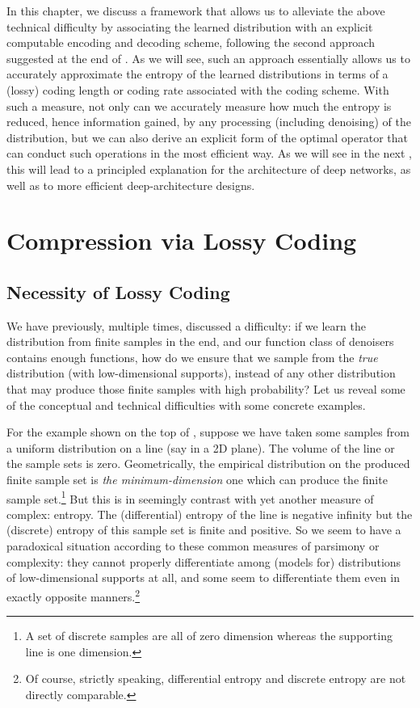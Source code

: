 \documentclass[../../book-main.tex]{subfiles}
\begin{document}
In this chapter, we discuss a framework that allows us to alleviate the above technical difficulty by associating the learned distribution with an explicit computable encoding and decoding scheme, following the second approach suggested at the end of . As we will see, such an approach essentially allows us to accurately approximate the entropy of the learned distributions in terms of a (lossy) coding length or coding rate associated with the coding scheme. With such a measure, not only can we accurately measure how much the entropy is reduced, hence information gained, by any processing (including denoising) of the distribution, but we can also derive an explicit form of the optimal operator that can conduct such operations in the most efficient way. As we will see in the next , this will lead to a principled explanation for the architecture of deep networks, as well as to more efficient deep-architecture designs.

\section{Compression via Lossy Coding} \label{sec:lossy_compression}

\subsection{Necessity of Lossy Coding}



We have previously, multiple times, discussed a difficulty: if we learn the distribution from finite samples in the end, and our function class of denoisers contains enough functions, how do we ensure that we sample from the \textit{true} distribution (with low-dimensional supports), instead of any other distribution that may produce those finite samples with high probability? Let us reveal some of the conceptual and technical difficulties with some concrete examples.

\begin{example}\label{eg:measures-of-complexity}
For the example shown on the top of , suppose we have taken some samples from a uniform distribution on a line (say in a 2D plane). The volume of the line or the sample sets is zero. 
Geometrically, the empirical distribution on the produced finite sample set is {\em the minimum-dimension} one which can produce  the finite sample set.\footnote{A set of discrete samples are all of zero dimension whereas the supporting line is one dimension.} But this is in seemingly contrast with yet another measure of complex: entropy. The (differential) entropy of the line is negative infinity but the (discrete) entropy of this sample set is finite and positive. So we seem to have a paradoxical situation according to these common measures of parsimony or complexity: they cannot properly differentiate among (models for) distributions of low-dimensional supports at all, and some seem to differentiate them even in exactly opposite manners.\footnote{Of course, strictly speaking, differential entropy and discrete entropy are not directly comparable.}
\end{example}
\end{document}
